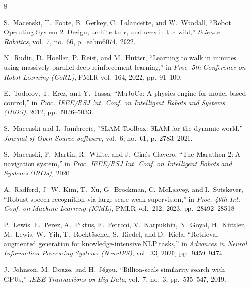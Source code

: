 \documentclass[10pt,twocolumn]{article}
\begin{document}

\begin{thebibliography}{8}

S.~Macenski, T.~Foote, B.~Gerkey, C.~Lalancette, and W.~Woodall, ``Robot Operating System 2: Design, architecture, and uses in the wild,'' \emph{Science Robotics}, vol.~7, no.~66, p.~eabm6074, 2022.

N.~Rudin, D.~Hoeller, P.~Reist, and M.~Hutter, ``Learning to walk in minutes using massively parallel deep reinforcement learning,'' in \emph{Proc. 5th Conference on Robot Learning (CoRL)}, PMLR vol.~164, 2022, pp.~91--100.

E.~Todorov, T.~Erez, and Y.~Tassa, ``MuJoCo: A physics engine for model-based control,'' in \emph{Proc. IEEE/RSJ Int. Conf. on Intelligent Robots and Systems (IROS)}, 2012, pp.~5026--5033.

S.~Macenski and I.~Jambrecic, ``SLAM Toolbox: SLAM for the dynamic world,'' \emph{Journal of Open Source Software}, vol.~6, no.~61, p.~2783, 2021.

S.~Macenski, F.~Mart\'{i}n, R.~White, and J.~Gin\'{e}s Clavero, ``The Marathon 2: A navigation system,'' in \emph{Proc. IEEE/RSJ Int. Conf. on Intelligent Robots and Systems (IROS)}, 2020.

A.~Radford, J.~W.~Kim, T.~Xu, G.~Brockman, C.~McLeavey, and I.~Sutskever, ``Robust speech recognition via large-scale weak supervision,'' in \emph{Proc. 40th Int. Conf. on Machine Learning (ICML)}, PMLR vol.~202, 2023, pp.~28492--28518.

P.~Lewis, E.~Perez, A.~Piktus, F.~Petroni, V.~Karpukhin, N.~Goyal, H.~K\"{u}ttler, M.~Lewis, W.~Yih, T.~Rockt\"{a}schel, S.~Riedel, and D.~Kiela, ``Retrieval-augmented generation for knowledge-intensive NLP tasks,'' in \emph{Advances in Neural Information Processing Systems (NeurIPS)}, vol.~33, 2020, pp.~9459--9474.

J.~Johnson, M.~Douze, and H.~J\'{e}gou, ``Billion-scale similarity search with GPUs,'' \emph{IEEE Transactions on Big Data}, vol.~7, no.~3, pp.~535--547, 2019.

\end{thebibliography}
\end{document}
